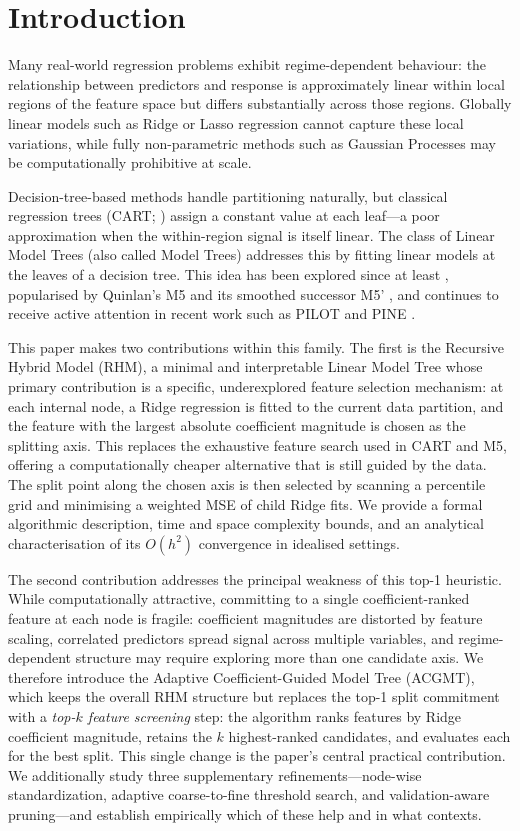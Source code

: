 \documentclass[11pt,a4paper]{article}
\begin{document}
\section{Introduction}

Many real-world regression problems exhibit regime-dependent behaviour: the relationship between predictors and response is approximately linear within local regions of the feature space but differs substantially across those regions. Globally linear models such as Ridge or Lasso regression cannot capture these local variations, while fully non-parametric methods such as Gaussian Processes may be computationally prohibitive at scale.

Decision-tree-based methods handle partitioning naturally, but classical regression trees (CART; \citealt{breiman1984}) assign a constant value at each leaf---a poor approximation when the within-region signal is itself linear. The class of Linear Model Trees (also called Model Trees) addresses this by fitting linear models at the leaves of a decision tree. This idea has been explored since at least \citet{friedman1979}, popularised by Quinlan's M5 \citep{quinlan1992} and its smoothed successor M5' \citep{wang1997}, and continues to receive active attention in recent work such as PILOT \citep{raymaekers2024} and PINE \citep{li2024}.

This paper makes two contributions within this family. The first is the Recursive Hybrid Model (RHM), a minimal and interpretable Linear Model Tree whose primary contribution is a specific, underexplored feature selection mechanism: at each internal node, a Ridge regression is fitted to the current data partition, and the feature with the largest absolute coefficient magnitude is chosen as the splitting axis. This replaces the exhaustive feature search used in CART and M5, offering a computationally cheaper alternative that is still guided by the data. The split point along the chosen axis is then selected by scanning a percentile grid and minimising a weighted MSE of child Ridge fits. We provide a formal algorithmic description, time and space complexity bounds, and an analytical characterisation of its $O(h^2)$ convergence in idealised settings.

The second contribution addresses the principal weakness of this top-1 heuristic. While computationally attractive, committing to a single coefficient-ranked feature at each node is fragile: coefficient magnitudes are distorted by feature scaling, correlated predictors spread signal across multiple variables, and regime-dependent structure may require exploring more than one candidate axis. We therefore introduce the Adaptive Coefficient-Guided Model Tree (ACGMT), which keeps the overall RHM structure but replaces the top-1 split commitment with a \emph{top-$k$ feature screening} step: the algorithm ranks features by Ridge coefficient magnitude, retains the $k$ highest-ranked candidates, and evaluates each for the best split. This single change is the paper's central practical contribution. We additionally study three supplementary refinements---node-wise standardization, adaptive coarse-to-fine threshold search, and validation-aware pruning---and establish empirically which of these help and in what contexts.
\end{document}
